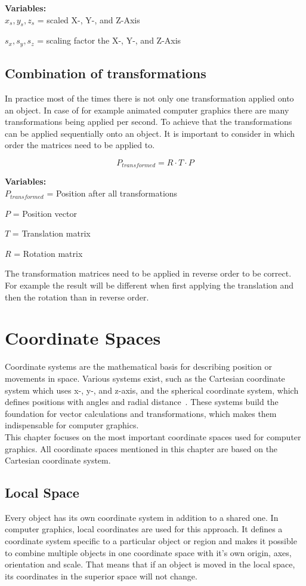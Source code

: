 \textbf{Variables: } \\
$x_s, y_s, z_s$ = scaled X-, Y-, and Z-Axis

$s_x, s_y, s_z$ = scaling factor the X-, Y-, and Z-Axis\\\cite{Web:72}


\subsection{Combination of transformations}
In practice most of the times there is not only one transformation applied onto an object. In case of for example animated computer graphics there are many transformations being applied per second. To achieve that the transformations can be applied sequentially onto an object. It is important to consider in which order the matrices need to be applied to.~\cite{Web:38}

\[
P_{transformed} = R \cdot T \cdot P
\]

\textbf{Variables:}\\
$P_{transformed}$ = Position after all transformations

$P$ = Position vector

$T$ = Translation matrix

$R$ = Rotation matrix

The transformation matrices need to be applied in reverse order to be correct. For example the result will be different when first applying the translation and then the rotation than in reverse order.\ \cite{Web:38}



\section{Coordinate Spaces}
Coordinate systems are the mathematical basis for describing position or movements in space. Various systems exist, such as the Cartesian coordinate system which uses x-, y-, and z-axis, and the spherical coordinate system, which defines positions with angles and radial distance\ \cite{Web:35}. These systems build the foundation for vector calculations and transformations, which makes them indispensable for computer graphics. \\
This chapter focuses on the most important coordinate spaces used for computer graphics. All coordinate spaces mentioned in this chapter are based on the Cartesian coordinate system.

\subsection{Local Space}
    Every object has its own coordinate system in addition to a shared one. In computer graphics, local coordinates are used for this approach. It defines
    a coordinate system specific to a particular object or region and makes it possible to combine multiple objects in one coordinate space with it's own origin, axes, orientation and scale. That means that if an object is moved in the local space, its coordinates in the superior 
    space will not change.\ \cite{Web:01}

